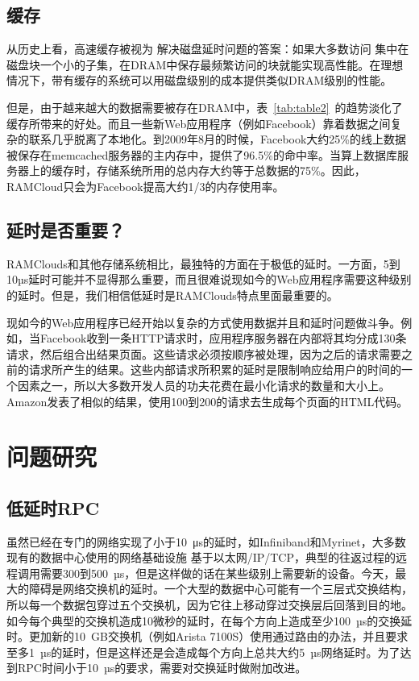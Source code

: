 \documentclass[translation]{zjutreport}
\begin{document}
\section{缓存}
从历史上看，高速缓存被视为
解决磁盘延时问题的答案：如果大多数访问
集中在磁盘块一个小的子集，在DRAM中保存最频繁访问的块就能实现高性能。在理想情况下，带有缓存的系统可以用磁盘级别的成本提供类似DRAM级别的性能。

但是，由于越来越大的数据需要被存在DRAM中，表~\ref{tab:table2}~的趋势淡化了缓存所带来的好处。而且一些新Web应用程序（例如Facebook）靠着数据之间复杂的联系几乎脱离了本地化。到2009年8月的时候，Facebook大约25\%的线上数据被保存在memcached服务器的主内存中，提供了96.5\%的命中率。当算上数据库服务器上的缓存时，存储系统所用的总内存大约等于总数据的75\%。因此，RAMCloud只会为Facebook提高大约1/3的内存使用率。

\section{延时是否重要？}
RAMClouds和其他存储系统相比，最独特的方面在于极低的延时。一方面，5到10µs延时可能并不显得那么重要，而且很难说现如今的Web应用程序需要这种级别的延时。但是，我们相信低延时是RAMClouds特点里面最重要的。

现如今的Web应用程序已经开始以复杂的方式使用数据并且和延时问题做斗争。例如，当Facebook收到一条HTTP请求时，应用程序服务器在内部将其均分成130条请求，然后组合出结果页面。这些请求必须按顺序被处理，因为之后的请求需要之前的请求所产生的结果。这些内部请求所积累的延时是限制响应给用户的时间的一个因素之一，所以大多数开发人员的功夫花费在最小化请求的数量和大小上。Amazon发表了相似的结果，使用100到200的请求去生成每个页面的HTML代码。

\chapter{问题研究}
\section{低延时RPC}
虽然已经在专门的网络实现了小于10~μs的延时，如Infiniband和Myrinet，大多数现有的数据中心使用的网络基础设施
基于以太网/IP/TCP，典型的往返过程的远程调用需要300到500~µs，但是这样做的话在某些级别上需要新的设备。今天，最大的障碍是网络交换机的延时。一个大型的数据中心可能有一个三层式交换结构，所以每一个数据包穿过五个交换机，因为它往上移动穿过交换层后回落到目的地。如今每个典型的交换机造成10微秒的延时，在每个方向上造成至少100~µs的交换延时。更加新的10~GB交换机（例如Arista 7100S）使用通过路由的办法，并且要求至多1~µs的延时，但是这样还是会造成每个方向上总共大约5~µs网络延时。为了达到RPC时间小于10~µs的要求，需要对交换延时做附加改进。
\end{document}
